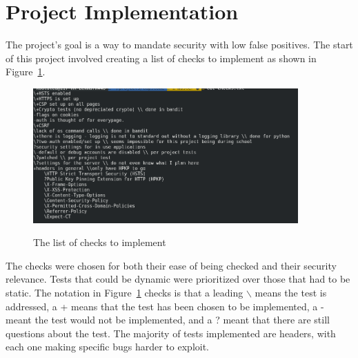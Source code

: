 \section{Project Implementation}
The project's goal is a way to mandate security with low false positives. The start of this project involved creating a list of checks to implement as shown in Figure~\ref{fig:fig1}.
\begin{figure}[!ht]
  \centering
\includegraphics[width=4in]{unittestchecks}
\caption{\label{fig:fig1}}The list of checks to implement
\end{figure}
The checks were chosen for both their ease of being checked and their security relevance. Tests that could be dynamic were prioritized over those that had to be static. The notation in 
Figure~\ref{fig:fig1} checks is that a leading $\backslash$ means the test is addressed, a + means that the test has been chosen to be implemented, a - meant the test would not be implemented, and a ?
meant that there are still questions about the test. The majority of tests implemented are headers, with each one making specific bugs harder to exploit.


